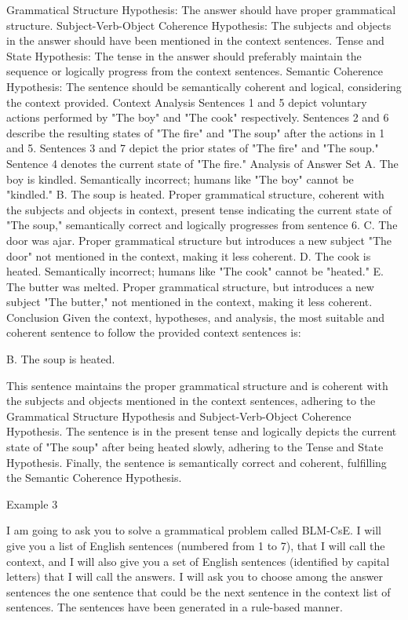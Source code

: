 Grammatical Structure Hypothesis: The answer should have proper grammatical structure.
Subject-Verb-Object Coherence Hypothesis: The subjects and objects in the answer should have been mentioned in the context sentences.
Tense and State Hypothesis: The tense in the answer should preferably maintain the sequence or logically progress from the context sentences.
Semantic Coherence Hypothesis: The sentence should be semantically coherent and logical, considering the context provided.
Context Analysis
Sentences 1 and 5 depict voluntary actions performed by "The boy" and "The cook" respectively.
Sentences 2 and 6 describe the resulting states of "The fire" and "The soup" after the actions in 1 and 5.
Sentences 3 and 7 depict the prior states of "The fire" and "The soup."
Sentence 4 denotes the current state of "The fire."
Analysis of Answer Set
A. The boy is kindled.
Semantically incorrect; humans like "The boy" cannot be "kindled."
B. The soup is heated.
Proper grammatical structure, coherent with the subjects and objects in context, present tense indicating the current state of "The soup," semantically correct and logically progresses from sentence 6.
C. The door was ajar.
Proper grammatical structure but introduces a new subject "The door" not mentioned in the context, making it less coherent.
D. The cook is heated.
Semantically incorrect; humans like "The cook" cannot be "heated."
E. The butter was melted.
Proper grammatical structure, but introduces a new subject "The butter," not mentioned in the context, making it less coherent.
Conclusion
Given the context, hypotheses, and analysis, the most suitable and coherent sentence to follow the provided context sentences is:

B. The soup is heated.

This sentence maintains the proper grammatical structure and is coherent with the subjects and objects mentioned in the context sentences, adhering to the Grammatical Structure Hypothesis and Subject-Verb-Object Coherence Hypothesis. The sentence is in the present tense and logically depicts the current state of "The soup" after being heated slowly, adhering to the Tense and State Hypothesis. Finally, the sentence is semantically correct and coherent, fulfilling the Semantic Coherence Hypothesis.


Example 3 

I am going to ask you to solve a grammatical problem called BLM-CsE.  I will give you a list of English sentences (numbered from 1 to 7), that I will call the context, and I will also give you a set of English sentences (identified by capital letters) that I will call  the answers. I will ask you to choose among the answer sentences the one sentence that could be the next sentence in the context list of sentences. The sentences have been generated in a rule-based manner. 

